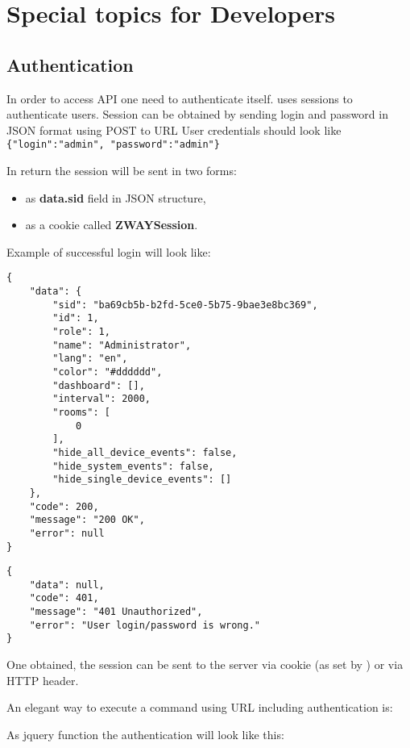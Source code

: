 \chapter{Special topics for Developers}

\section{Authentication}
\label{cap:authentication}

In order to access API one need to authenticate itself. \zway uses sessions
to authenticate users. Session can be obtained by sending login and password
in JSON format using POST to URL 
User
credentials should look like \texttt{\{"login":"admin", "password":"admin"\}}

In return the session will be sent in two forms:
\begin{itemize}
\item as \textbf{data.sid} field in JSON structure,
\item as a cookie called \textbf{ZWAYSession}.
\end{itemize}

Example of successful login will look like:
\begin{lstlisting}[caption=Successful login reply,basicstyle=\small,columns=fullflexible]
{
    "data": {
        "sid": "ba69cb5b-b2fd-5ce0-5b75-9bae3e8bc369",
        "id": 1,
        "role": 1,
        "name": "Administrator",
        "lang": "en",
        "color": "#dddddd",
        "dashboard": [],
        "interval": 2000,
        "rooms": [
            0
        ],
        "hide_all_device_events": false,
        "hide_system_events": false,
        "hide_single_device_events": []
    },
    "code": 200,
    "message": "200 OK",
    "error": null
}
\end{lstlisting}

\begin{lstlisting}[caption=Wrong login/password reply,basicstyle=\small,columns=fullflexible]
{
    "data": null,
    "code": 401,
    "message": "401 Unauthorized",
    "error": "User login/password is wrong."
}
\end{lstlisting}

One obtained, the session can be sent to the server via cookie (as set by
\zway) or via HTTP header.

An elegant way to execute a command using URL including authentication is:

{\scriptsize
\begin{quote} 
\end{quote}  
}
As jquery function the authentication will look like this:

